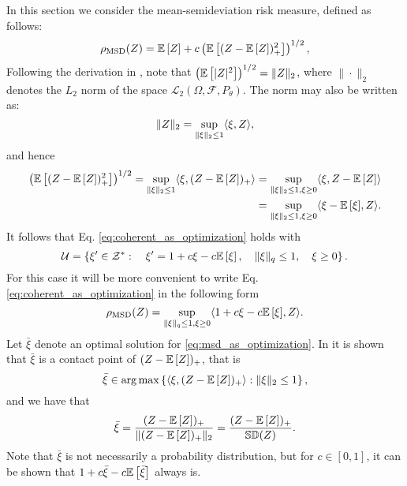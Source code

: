 In this section we consider the mean-semideviation risk measure, defined as follows:
\begin{equation}\label{eq:mean-sd_def}
    \rho_{\text{MSD}}(Z) = \mathbb{E}\left[ Z \right] + c\left( \mathbb{E}\left[ (Z - \mathbb{E}\left[ Z \right])_{+}^{2} \right] \right)^{1 / 2},
\end{equation}
Following the derivation in \cite{Shapiro2009}, note that $\left( \mathbb{E}\left[ |Z|^{2} \right] \right)^{1 / 2} = \|Z\|_2$, where $\|\cdot\|_2$ denotes the $L_2$ norm of the space $\mathcal L_2 (\Omega,\mathcal F,P_\theta)$. The norm may also be written as:
\begin{equation*}
    \|Z\|_2 = \sup_{\|\xi\|_2 \leq 1} \langle {\xi},{Z} \rangle,
\end{equation*}
and hence
\begin{equation*}
\begin{split}
  \left( \mathbb{E}\left[ (Z - \mathbb{E}\left[ Z \right])_{+}^{2} \right] \right)^{1 / 2} = \sup_{\|\xi\|_2 \leq 1} \langle {\xi},{(Z - \mathbb{E}\left[ Z \right])_{+}} \rangle &= \sup_{\|\xi\|_2 \leq 1, \xi \geq 0} \langle {\xi},{Z - \mathbb{E}\left[ Z \right]} \rangle \\
    &= \sup_{\|\xi\|_2 \leq 1, \xi \geq 0} \langle {\xi - \mathbb{E}\left[ \xi \right]},{Z} \rangle.
\end{split}
\end{equation*}
It follows that Eq. \eqref{eq:coherent_as_optimization} holds with
\begin{equation*}
    {\mathcal{U}} = \left\{ \xi' \in \mathcal Z^* : \quad \xi' = 1 + c \xi - c \mathbb{E}\left[ \xi \right], \quad \|\xi\|_q \leq 1, \quad \xi \geq 0  \right\}.
\end{equation*}
For this case it will be more convenient to write Eq. \eqref{eq:coherent_as_optimization} in the following form
\begin{equation}\label{eq:msd_as_optimization}
    \rho_{\text{MSD}}(Z) = \sup_{\|\xi\|_q \leq 1, \xi \geq 0} \langle {1 + c \xi - c \mathbb{E}\left[ \xi \right]},{Z} \rangle.
\end{equation}
Let $\bar{\xi}$ denote an optimal solution for \eqref{eq:msd_as_optimization}. In \cite{Shapiro2009} it is shown that $\bar{\xi}$ is a contact point of $(Z - \mathbb{E}\left[ Z \right])_{+}$, that is
\begin{equation*}
    \bar{\xi} \in \arg \max \left\{ \langle {\xi},{(Z - \mathbb{E}\left[ Z \right])_{+}} \rangle: \|\xi\|_2 \leq 1 \right\},
\end{equation*}
and we have that
\begin{equation}\label{eq:bar_xi_p2}
\bar{\xi} = \frac{(Z - \mathbb{E}\left[ Z \right])_{+}}{\|(Z - \mathbb{E}\left[ Z \right])_{+}\|_2} = \frac{(Z - \mathbb{E}\left[ Z \right])_{+}}{\mathbb{SD}(Z)}.
\end{equation}
Note that $\bar{\xi}$ is not necessarily a probability distribution, but for $c\in[0,1]$, it can be shown \cite{Shapiro2009} that $1 + c \bar{\xi} - c \mathbb{E}\left[ \bar{\xi} \right]$ always is.

